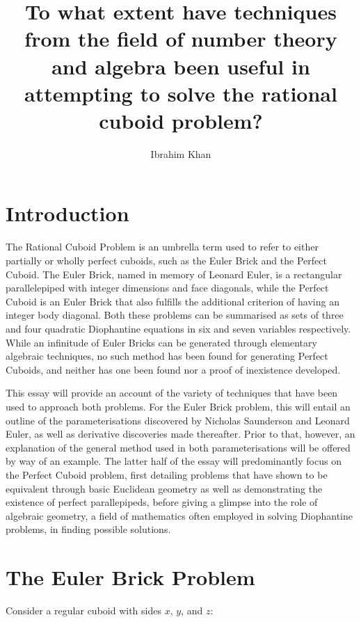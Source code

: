 \documentclass[11pt]{article}
\title{\textbf{To what extent have techniques from the field of number theory and algebra been useful in attempting to solve the rational cuboid problem?}}
\author{Ibrahim Khan}
\date{}
\begin{document}
\maketitle
\newpage
\tableofcontents
\newpage
\section{Introduction}
The Rational Cuboid Problem is an umbrella term used to refer to either partially or wholly perfect cuboids, such as the Euler Brick and the Perfect Cuboid. The Euler Brick, named in memory of Leonard Euler, is a rectangular parallelepiped with integer dimensions and face diagonals, while the Perfect Cuboid is an Euler Brick that also fulfills the additional criterion of having an integer body diagonal. Both these problems can be summarised as sets of three and four quadratic Diophantine equations in six and seven variables respectively. While an infinitude of Euler Bricks can be generated through elementary algebraic techniques, no such method has been found for generating Perfect Cuboids, and neither has one been found nor a proof of inexistence developed. 

This essay will provide an account of the variety of techniques that have been used to approach both problems. For the Euler Brick problem, this will entail an outline of the parameterisations discovered by Nicholas Saunderson and Leonard Euler, as well as derivative discoveries made thereafter. Prior to that, however, an explanation of the general method used in both parameterisations will be offered by way of an example. The latter half of the essay will predominantly focus on the Perfect Cuboid problem, first detailing problems that have shown to be equivalent through basic Euclidean geometry as well as demonstrating the existence of perfect parallepipeds, before giving a glimpse into the role of algebraic geometry, a field of mathematics often employed in solving Diophantine problems, in finding possible solutions.

\section{The Euler Brick Problem}
Consider a regular cuboid with sides $x$, $y$, and $z$:
\end{document}
